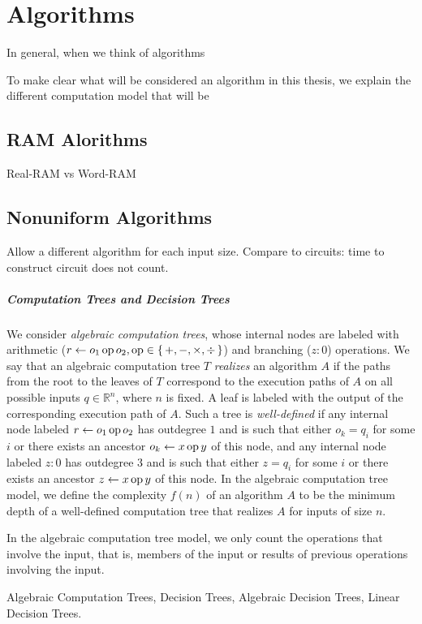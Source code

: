\chapter{Algorithms}

In general, when we think of algorithms 



To make clear what will be considered an algorithm in this thesis, we explain
the different computation model that will be

\section{RAM Alorithms}

Real-RAM vs Word-RAM

\section{Nonuniform Algorithms}



Allow a different algorithm for each input size.
Compare to circuits: time to construct circuit does not count.

\paragraph{Computation Trees and Decision Trees}
We consider \emph{algebraic computation trees}, whose internal nodes
are labeled with arithmetic (\(r \gets o_1 \operatorname{op} o_2, \operatorname{op} \in
\{\,+,-,\times,\div\,\}\)) and branching (\(z : 0\)) operations. We say that an
algebraic computation tree $T$ \emph{realizes} an algorithm $A$ if the paths
from the root to the leaves of $T$ correspond to the execution paths of \(A\)
on all possible inputs \(q \in \mathbb{R}^n\), where \(n\) is fixed. A leaf is
labeled with the output of the corresponding execution path of \(A\). Such a
tree is \emph{well-defined} if any internal node labeled \(r \gets o_1 \operatorname{op}
o_2\) has outdegree \(1\) and is such that either \(o_k = q_i\) for some \(i\)
or there exists an ancestor \(o_k \gets x \operatorname{op} y\) of this node, and any
internal node labeled \(z : 0\) has outdegree \(3\) and is such that either \(z
= q_i\) for some \(i\) or there exists an ancestor \(z \gets x \operatorname{op} y\) of this
node. In the algebraic computation tree model, we define the complexity
\(f(n)\) of an algorithm $A$ to be the minimum depth of a well-defined
computation tree that realizes $A$ for inputs of size $n$.

In the algebraic computation tree model, we only count the operations that
involve the input, that is, members of the input or results of previous
operations involving the input.

Algebraic Computation Trees,
Decision Trees,
Algebraic Decision Trees,
Linear Decision Trees.


